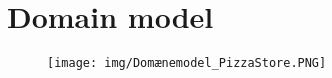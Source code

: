\section{Domain model}

\begin{figure}[htbp]
    \center
    \texttt{[image: img/Domænemodel\_PizzaStore.PNG]}
    \caption{}
\end{figure}


